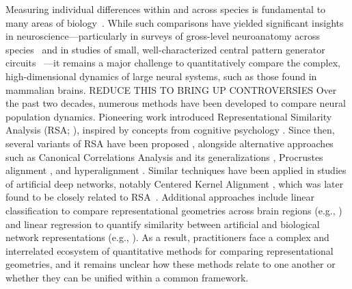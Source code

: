 Measuring individual differences within and across species is fundamental to many areas of biology~\parencite{nelson1970outline,wagner1989biological}.
While such comparisons have yielded significant insights in neuroscience—particularly in surveys of gross-level neuroanatomy across species~\parencite{butler2005comparative} and in studies of small, well-characterized central pattern generator circuits ~\parencite{Marder2006}—it remains a major challenge to quantitatively compare the complex, high-dimensional dynamics of large neural systems, such as those found in mammalian brains.
REDUCE THIS TO BRING UP CONTROVERSIES
Over the past two decades, numerous methods have been developed to compare neural population dynamics. Pioneering work introduced Representational Similarity Analysis (RSA; \cite{Kriegeskorte2008_frontiers}), inspired by concepts from cognitive psychology \parencite{edelman1998representation}. Since then, several variants of RSA have been proposed \parencite[see][for a review]{kriegeskorte2019peeling}, alongside alternative approaches such as Canonical Correlations Analysis \parencite[CCA;][]{Raghu2017,gallego2020long} and its generalizations \parencite[reviewed in][]{zhuang2020technical}, Procrustes alignment \parencite{degenhart2020stabilization}, and hyperalignment \parencite{haxby2011common, haxby2020hyperalignment}. Similar techniques have been applied in studies of artificial deep networks, notably Centered Kernel Alignment \parencite[CKA;][]{Kornblith2019}, which was later found to be closely related to RSA~\parencite{Williams2024}. Additional approaches include linear classification to compare representational geometries across brain regions (e.g., \cite{bernardi}) and linear regression to quantify similarity between artificial and biological network representations (e.g., \cite{conwell2022can}). As a result, practitioners face a complex and interrelated ecosystem of quantitative methods for comparing representational geometries, and it remains unclear how these methods relate to one another or whether they can be unified within a common framework.



